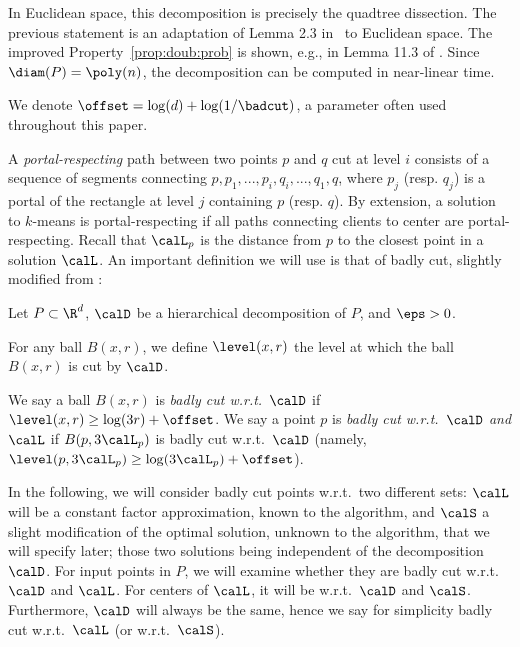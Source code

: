 In Euclidean space, this decomposition is precisely the quadtree dissection. The previous statement is an adaptation of Lemma 2.3 in~\cite{jacm} to Euclidean space. The improved Property~\ref{prop:doub:prob} is shown, e.g., in Lemma 11.3 of \cite{har2011geometric}.
Since $\diam(P) = \poly(n)$, the decomposition can be computed in near-linear time.

We denote %
$\offset = \log(d) + \log(1/\badcut)$,
a parameter often used throughout this paper.

A \emph{portal-respecting} path between two points $p$ and $q$ cut at level $i$ consists of a sequence of segments connecting $p, p_1, ..., p_i, q_i, ..., q_1, q$, where $p_j$ (resp. $q_j$) is a portal of the rectangle at level $j$ containing $p$ (resp. $q$). 
By extension, a solution to $k$-means is portal-respecting if all paths connecting clients to center are portal-respecting. Recall that $\calL_p$ is the distance from $p$ to the closest point in a solution $\calL$. An important definition we will use is that of badly cut, slightly modified from \cite{jacm}:

\begin{definition}\label{def:badlycut}
  Let $P\subset \R^d$, $\calD$ be 
a hierarchical decomposition of $P$, and $\eps > 0$. 

For any ball $B(x, r)$, we define $\level(x, r)$ the level at which the ball $B(x,r)$ is cut by $\calD$. 

We say a ball $B(x, r)$ is \emph{badly cut w.r.t.\ $\calD$} if 
$\level(x, r) \geq \log(3r) + \offset$.
We say a point $p$ is \emph{badly cut w.r.t.\ $\calD$ and $\calL$} if $B(p, 3\calL_p)$ is badly cut w.r.t.\ $\calD$ (namely,
$\level(p, 3\calL_p) \geq \log(3\calL_p) + \offset$).
\end{definition}

In the following, we will consider badly cut points w.r.t.\ two different sets: 
$\calL$ will be a  constant factor approximation, known to the algorithm, and $\calS$ a slight modification of the optimal solution, unknown to the algorithm, that we will specify later; those two solutions being independent of the decomposition $\calD$.
For input points in $P$, we will examine whether they are badly cut w.r.t.\ $\calD$ and $\calL$. 
For centers of $\calL$, it will be w.r.t.\ $\calD$ and $\calS$. 
Furthermore, $\calD$ will always be the same, hence we  say for simplicity badly cut w.r.t.\ $\calL$ (or w.r.t.\ $\calS$).

